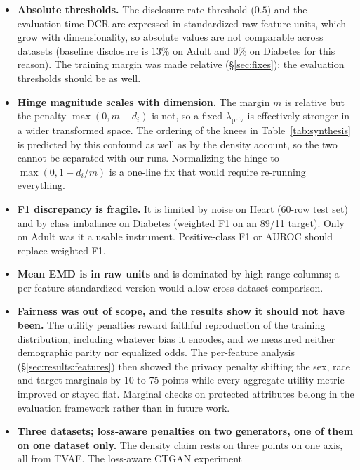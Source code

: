 \documentclass[11pt,a4paper]{article}
\newcommand{\lpriv}{\lambda_{\text{priv}}}
\begin{document}
\begin{itemize}[nosep]
        separate, both as a metric and as a loss term. A multi-scale kernel
        would reduce this problem.
  \item \textbf{Absolute thresholds.} The disclosure-rate threshold ($0.5$)
        and the evaluation-time DCR are expressed in standardized raw-feature
        units, which grow with dimensionality, so absolute values are not
        comparable across datasets (baseline disclosure is 13\% on Adult and
        0\% on Diabetes for this reason). The training margin was made relative
        (\S\ref{sec:fixes}); the evaluation thresholds should be as well.
  \item \textbf{Hinge magnitude scales with dimension.} The margin $m$ is
        relative but the penalty $\max(0, m - d_i)$ is not, so a fixed
        $\lpriv$ is effectively stronger in a wider transformed space. The
        ordering of the knees in Table~\ref{tab:synthesis} is predicted by
        this confound as well as by the density account, so the two cannot be
        separated with our runs. Normalizing the hinge to
        $\max(0, 1 - d_i/m)$ is a one-line fix that would require re-running
        everything.
  \item \textbf{F1 discrepancy is fragile.} It is limited by noise on Heart
        (60-row test set) and by class imbalance on Diabetes (weighted F1 on
        an 89/11 target). Only on Adult was it a usable instrument.
        Positive-class F1 or AUROC should replace weighted F1.
  \item \textbf{Mean EMD is in raw units} and is dominated by high-range
        columns; a per-feature standardized version would allow cross-dataset
        comparison.
  \item \textbf{Fairness was out of scope, and the results show it should
        not have been.} The utility penalties reward faithful reproduction of
        the training distribution, including whatever bias it encodes, and we
        measured neither demographic parity nor equalized odds. The
        per-feature analysis (\S\ref{sec:results:features}) then showed the
        privacy penalty shifting the sex, race and target marginals by 10 to
        75 points while every aggregate utility metric improved or stayed
        flat. Marginal checks on protected attributes belong in the evaluation
        framework rather than in future work.
  \item \textbf{Three datasets; loss-aware penalties on two generators, one
        of them on one dataset only.} The density claim rests on three points
        on one axis, all from TVAE. The loss-aware CTGAN experiment

\end{itemize}
\end{document}
